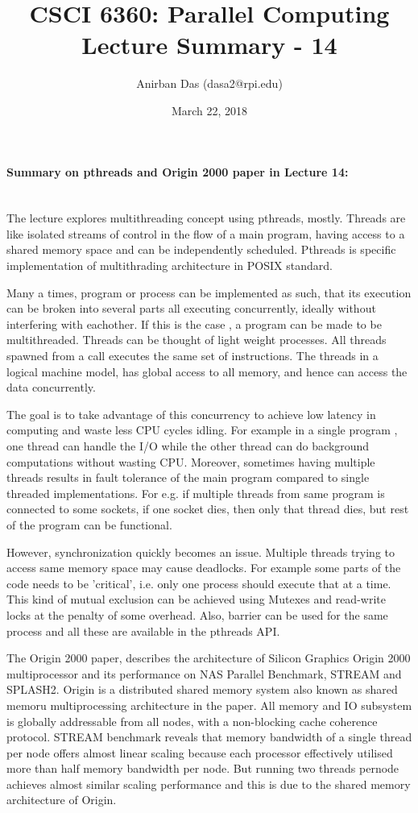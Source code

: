 \documentclass[a4paper,12 pt]{article}
\title{\vspace{-2.0cm}CSCI 6360: Parallel Computing Lecture Summary - 14}
\author{Anirban Das (dasa2@rpi.edu) }
\date{March 22, 2018}
\begin{document}
\maketitle

\paragraph{Summary on pthreads and Origin 2000 paper in Lecture 14:\\\\}

The lecture explores multithreading concept using pthreads, mostly. Threads are like isolated streams of control
in the flow of a main program, having access to a shared memory space and can be independently scheduled. Pthreads is specific implementation of multithrading architecture in POSIX standard. 

Many a times, program or process can be implemented as such, that its execution can be broken into several parts all executing concurrently, ideally without interfering with eachother. If this is the case , a program can be made to be multithreaded. Threads can be thought of light weight processes. All threads spawned from a call executes the same set of instructions. The threads in a logical machine model, has global access to all memory, and hence can access the data concurrently.

The goal is to take advantage of this concurrency to achieve low latency in computing and waste less CPU cycles idling. For example in a single program , one thread can handle the I/O while the other thread can do background computations without wasting CPU. Moreover, sometimes having multiple threads results in fault tolerance of the main program compared to single threaded implementations. For e.g. if multiple threads from same program is connected to some sockets, if one socket dies, then only that thread dies, but rest of the program can be functional.

However, synchronization quickly becomes an issue. Multiple threads trying to access same memory space may cause deadlocks. For example some parts of the code needs to be 'critical', i.e. only one process should execute that at a time. This kind of mutual exclusion can be achieved using Mutexes and read-write locks at the penalty of some overhead. Also, barrier can be used for the same process and all these are available in the pthreads API. 

The Origin 2000 paper, describes the architecture of Silicon Graphics Origin 2000 multiprocessor and its performance on NAS Parallel Benchmark, STREAM and SPLASH2. Origin is a distributed shared memory system also known as shared memoru multiprocessing architecture in the paper. All memory and IO subsystem is globally addressable from all nodes, with a non-blocking cache coherence protocol. STREAM benchmark reveals that memory bandwidth of a single thread per node offers almost linear scaling because each processor effectively utilised more than half memory bandwidth per node. But running two threads pernode achieves almost similar scaling performance and this is due to the shared memory architecture of Origin.  
\end{document}

